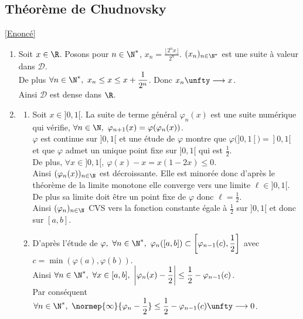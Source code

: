 \documentclass{book}
\begin{document}
	\subsection{Théorème de Chudnovsky }
	\label{sec:theoreme-de-chudnovsky-etoile4}
	\textcolor{blue}{\hyperref[Théorème de Chudnovsky]{[Enoncé]}}\\
	\begin{enumerate}[leftmargin=*]
		\item Soit $x\in \R$. Posons pour $n\in \N^*$, $x_n=\displaystyle\frac{\lfloor 2^nx\rfloor}{2^n}$. $(x_n)_{n\in \N^*}$ est une suite à valeur dans $\mathcal D$.\\
		De plus $\forall n\in \N^*,\ x_n\leq x\leq x+\displaystyle\frac{1}{2^n}$. Donc $x_n\unfty\longrightarrow x$.\\
		Ainsi $\mathcal D$ est dense dans $\R$.
		\item
		\begin{enumerate}[label=\alph*.]
			\item Soit $x\in ]0,1[$. La suite de terme général $\varphi_n(x)$ est une suite numérique qui vérifie, $\forall n\in \N,\ \varphi_{n+1}(x)=\varphi(\varphi_n(x))$.\\
			$\varphi$ est continue sur $]0,1[$ et une étude de $\varphi$ montre que $\displaystyle\varphi(]0,1[)=]0,1[$ et que $\varphi$ admet un unique point fixe sur $]0,1[$ qui est $\displaystyle\frac{1}{2}$.\\
			De plus, $\forall x\in ]0,1[,\ \varphi(x)-x=x(1-2x)\leq 0$.\\
			Ainsi $(\varphi_n(x))_{n\in \N}$ est décroissante. Elle est minorée donc d'après le théorème de la limite monotone elle converge vers une limite $\ell\in ]0,1[$.\\
			De plus sa limite doit être un point fixe de $\varphi$ donc $\ell=\displaystyle\frac{1}{2}$.\\
			Ainsi $(\varphi_n)_{n\in \N}$ CVS vers la fonction constante égale à $\displaystyle\frac{1}{2}$ sur $]0,1[$ et donc sur $[a,b]$.
			\item D'après l'étude de $\varphi,\ \forall n\in \N^*,\ \varphi_n([a,b])\subset \left[\varphi_{n-1}(c),\displaystyle\frac{1}{2}\right]$ avec $c=\min(\varphi(a),\varphi(b))$.\\
			Ainsi $\forall n\in \N^*,\ \forall x\in [a,b],\ \displaystyle\left|\varphi_n(x)-\frac{1}{2}\right|\leq \frac{1}{2}-\varphi_{n-1}(c)$.\\
			Par conséquent $\forall n\in \N^*,\ \displaystyle\normep{\infty}{\varphi_n-\frac{1}{2}}\leq \frac{1}{2}-\varphi_{n-1}(c)\unfty\longrightarrow 0$.\\

\end{enumerate}
\end{enumerate}
\end{document}
